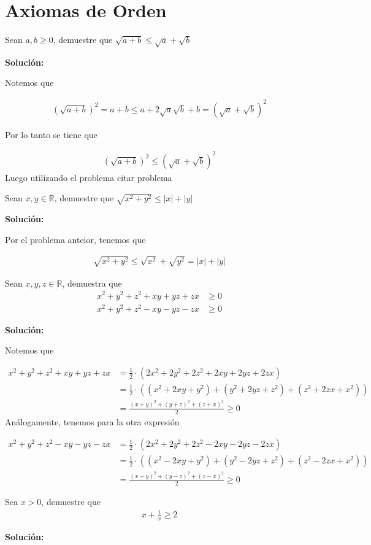 \documentclass[12pt]{book}
\begin{document}
\chapter{Axiomas de Orden}

\begin{prob}{}{}
   Sean $a,b \geq 0 $, demuestre que $\sqrt{a+b}\leq \sqrt{a}+\sqrt{b}$
\end{prob}
\textbf{Solución:}

Notemos que 

\begin{align*}
    \left(\sqrt{a+b}\right)^2=a+b \leq a +2 \sqrt{a}\sqrt{b}+b = \left(\sqrt{a}+\sqrt{b}\right)^2
\end{align*}

Por lo tanto se tiene que 

\begin{align*}
     \left(\sqrt{a+b}\right)^2 \leq \left(\sqrt{a}+\sqrt{b}\right)^2
\end{align*}
Luego utilizando el problema {\Large citar problema}

\begin{prob}{}{}
    Sean $x,y \in \mathbb{R}$, demuestre que $\sqrt{x^2+y^2}\leq |x|+|y|$
\end{prob}
\textbf{Solución:}

Por el problema anteior, tenemos que 

\begin{align*}
    \sqrt{x^2+y^2}\leq \sqrt{x^2}+\sqrt{y^2}=|x|+|y|
\end{align*}

\begin{prob}{}{}
Sean $x,y,z \in \mathbb{R}$, demuestra que 
\begin{align*}
    x^2+y^2+z^2+xy+yz+zx &\geq 0 \\
    x^2+y^2+z^2-xy-yz-zx &\geq 0 
\end{align*}
\end{prob}
\textbf{Solución:}

Notemos que 

\begin{align}
    x^2+y^2+z^2+xy+yz+zx&= \frac{1}{2}\cdot ( 2x^2+2y^2+2z^2+2xy+2yz+2zx) \\
    &=\frac{1}{2}\cdot ((x^2+2xy+y^2)+(y^2+2yz+z^2)+(z^2+2zx+x^2)) \\
    &=\frac{(x+y)^2+(y+z)^2+(z+x)^2}{2} \geq 0
\end{align}
Análogamente, tenemos para la otra expresión

\begin{align*}
    x^2+y^2+z^2-xy-yz-zx&= \frac{1}{2}\cdot(2x^2+2y^2+2z^2-2xy-2yz-2zx) \\
    &=\frac{1}{2}\cdot((x^2-2xy+y^2)+(y^2-2yz+z^2)+(z^2-2zx+x^2)) \\
    &=\frac{(x-y)^2+(y-z)^2+(z-x)^2}{2} \geq 0
\end{align*}
\begin{prob}{}{}
Sea $x>0$, demuestre que 
\begin{align*}
    x+\frac{1}{x}\geq 2
\end{align*}
\end{prob}
\textbf{Solución:}
\end{document}
